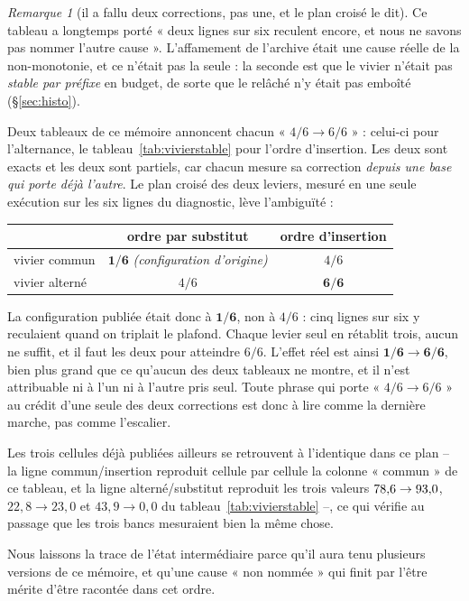 \documentclass[11pt,a4paper]{article}
\theoremstyle{plain}
\theoremstyle{remark}
\newtheorem{remark}{Remarque}
\begin{document}
\begin{remark}[il a fallu deux corrections, pas une, et le plan croisé le dit]
\label{rem:croise}
Ce tableau a longtemps porté « deux lignes sur six reculent encore, et nous
ne savons pas nommer l'autre cause ». L'affamement de l'archive était une
cause réelle de la non-monotonie, et ce n'était pas la seule : la seconde
est que le vivier n'était pas \emph{stable par préfixe} en budget, de sorte
que le relâché n'y était pas emboîté (§\ref{sec:histo}).

Deux tableaux de ce mémoire annoncent chacun « $4/6\to 6/6$ » : celui-ci
pour l'alternance, le tableau~\ref{tab:vivierstable} pour l'ordre
d'insertion. Les deux sont exacts et les deux sont partiels, car chacun
mesure sa correction \emph{depuis une base qui porte déjà l'autre}. Le
plan croisé des deux leviers, mesuré en une seule exécution sur les six
lignes du diagnostic, lève l'ambiguïté :

\begin{center}\small
\begin{tabular}{lcc}
\toprule
& ordre par substitut & ordre d'insertion\\
\midrule
vivier commun   & $\mathbf{1/6}$ \emph{(configuration d'origine)} & $4/6$\\
vivier alterné  & $4/6$ & $\mathbf{6/6}$\\
\bottomrule
\end{tabular}
\end{center}

\noindent
La configuration publiée était donc à $\mathbf{1/6}$, non à $4/6$ : cinq
lignes sur six y reculaient quand on triplait le plafond. Chaque levier
seul en rétablit trois, aucun ne suffit, et il faut les deux pour atteindre
$6/6$. L'effet réel est ainsi $\mathbf{1/6\to 6/6}$, bien plus grand que ce
qu'aucun des deux tableaux ne montre, et il n'est attribuable ni à l'un ni
à l'autre pris seul. Toute phrase qui porte « $4/6\to 6/6$ » au crédit
d'une seule des deux corrections est donc à lire comme la dernière marche,
pas comme l'escalier.

Les trois cellules déjà publiées ailleurs se retrouvent à l'identique dans
ce plan -- la ligne \textsf{commun/insertion} reproduit cellule par cellule
la colonne « commun » de ce tableau, et la ligne
\textsf{alterné/substitut} reproduit les trois valeurs
$78{,}6{}\to93{,}0$, $22{,}8\to23{,}0$ et $43{,}9\to0{,}0$ du
tableau~\ref{tab:vivierstable} --, ce qui vérifie au passage que les trois
bancs mesuraient bien la même chose.

Nous laissons la trace de l'état intermédiaire parce qu'il aura tenu
plusieurs versions de ce mémoire, et qu'une cause « non nommée » qui finit
par l'être mérite d'être racontée dans cet ordre.
\end{remark}
\end{document}
